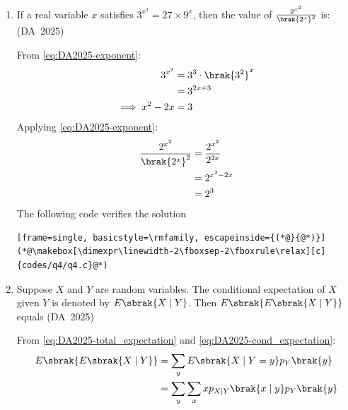 \begin{enumerate}[label=\thesubsection.\arabic*, ref=\thesubsection.\theenumi]
	\item 
	If a real variable $x$ satisfies $3^{x^2} = 27 \times 9^x$, then the value of $\frac{2^{x^2}}{\brak{2^x}^2}$ is:
	\hfill (DA~2025)
	\begin{enumerate}
	\end{enumerate}
	\solution
	From \eqref{eq:DA2025-exponent}:
	\begin{align}
		3^{x^2} &= 3^3 \cdot \brak{3^2}^x
		\\
		&= 3^{2x+3}
		\\
		\implies x^2 - 2x &= 3
	\end{align}
	Applying \eqref{eq:DA2025-exponent}:
	\begin{align}
		\frac{2^{x^2}}{\brak{2^x}^2} &= \frac{2^{x^2}}{2^{2x}}
		\\
		&= 2^{x^2 - 2x}
		\\
		&= 2^3
	\end{align}
	The following code verifies the solution
	\begin{lstlisting}[frame=single, basicstyle=\rmfamily, escapeinside={(*@}{@*)}]
(*@\makebox[\dimexpr\linewidth-2\fboxsep-2\fboxrule\relax][c]{codes/q4/q4.c}@*)
	\end{lstlisting}
\item 
Suppose $X$ and $Y$ are random variables. The conditional expectation of $X$ given $Y$ is denoted by $E\sbrak{X \mid Y}$. Then $E\sbrak{E\sbrak{X \mid Y}}$ equals
\hfill (DA~2025)
\begin{enumerate}
	\begin{multicols}{4}
		\item $E\sbrak{X \mid Y}$
		\item $\frac{E\sbrak{X}}{E\sbrak{Y}}$
		\item $E\sbrak{X}$
		\item $E\sbrak{Y}$
	\end{multicols}
\end{enumerate}
\solution
From \eqref{eq:DA2025-total_expectation} and \eqref{eq:DA2025-cond_expectation}:
\begin{align}
	E\sbrak{E\sbrak{X \mid Y}} &= \sum_y E\sbrak{X \mid Y = y} p_Y\brak{y}
	\\
	&= \sum_y \sum_x x p_{X \mid Y}\brak{x \mid y} p_Y\brak{y}

\end{align}
\end{enumerate}
